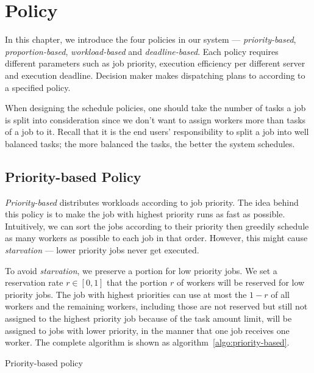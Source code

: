 \chapter{Policy}

In this chapter, we introduce the four policies in our system ---
\emph{priority-based}, \emph{proportion-based}, \emph{workload-based}
and \emph{deadline-based}.
Each policy requires different parameters such as job priority,
execution efficiency per different server and execution deadline.
Decision maker makes dispatching plans to according to a specified
policy.

When designing the schedule policies, one should take the number of
tasks a job is split into consideration since we don't want to assign
workers more than tasks of a job to it.
Recall that it is the end users' responsibility to split a job into well
balanced tasks; the more balanced the tasks, the better the system
schedules.


\section{Priority-based Policy}

\emph{Priority-based} distributes workloads according to job priority. 
The idea behind this policy is to make the job with highest priority runs as
fast as possible.
Intuitively, we can sort the jobs according to their priority then greedily
schedule as many workers as possible to each job in that order.
However, this might cause \emph{starvation} --- lower priority jobs
never get executed.


To avoid \emph{starvation}, we preserve a portion for low priority jobs.
We set a reservation rate $r \in [0,1]$ that the portion $r$ of workers
will be reserved for low priority jobs.
The job with highest priorities can use at most the $1-r$ of all workers
and the remaining workers, including those are not reserved but still not
assigned to the highest priority job because of the task amount limit,
will be assigned to jobs with lower priority, in the manner that one job
receives one worker.
The complete algorithm is shown as algorithm~\ref{algo:priority-based}.

\begin{algorithm}[H]
  \DontPrintSemicolon %
  
  \caption{Priority-based policy}
  \label{algo:priority-based}
\end{algorithm}


